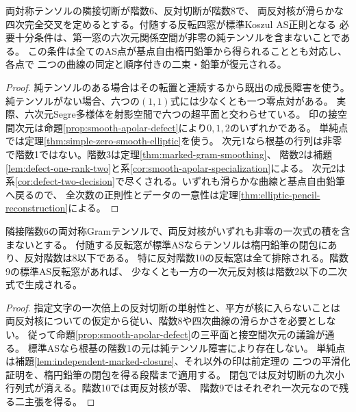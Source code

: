 \begin{theorem}[滑らかな反対四次曲線を持つ反転四窓の分類]\label{thm:smooth-apolar-complete}
両対称テンソルの隣接切断が階数6、反対切断が階数8で、
両反対核が滑らかな四次完全交叉を定めるとする。付随する反転四窓が標準Koszul AS正則となる
必要十分条件は、第一窓の六次元関係空間が非零の純テンソルを含まないことである。
この条件は全てのAS点が基点自由楕円鉛筆から得られることとも対応し、各点で
二つの曲線の同定と順序付きの二束・鉛筆が復元される。
\end{theorem}
\begin{proof}
純テンソルのある場合はその転置と連続するから既出の成長障害を使う。
純テンソルがない場合、六つの$(1,1)$式には少なくとも一つ零点対がある。
実際、六次元Segre多様体を射影空間で六つの超平面と交わらせている。
印の接空間次元は命題\ref{prop:smooth-apolar-defect}により$0,1,2$のいずれかである。
単純点では定理\ref{thm:simple-zero-smooth-elliptic}を使う。
次元1なら根基の行列は非零で階数1ではない。階数3は定理\ref{thm:marked-gram-smoothing}、
階数2は補題\ref{lem:defect-one-rank-two}と系\ref{cor:smooth-apolar-specialization}による。
次元2は系\ref{cor:defect-two-decision}で尽くされる。いずれも滑らかな曲線と基点自由鉛筆へ戻るので、
全次数の正則性とデータの一意性は定理\ref{thm:elliptic-pencil-reconstruction}による。
\end{proof}

\begin{corollary}\label{cor:bisymmetric-high-rank-exclusion}
隣接階数6の両対称Gramテンソルで、両反対核がいずれも非零の一次式の積を含まないとする。
付随する反転窓が標準ASならテンソルは楕円鉛筆の閉包にあり、反対階数は8以下である。
特に反対階数10の反転窓は全て排除される。階数9の標準AS反転窓があれば、
少なくとも一方の一次元反対核は階数2以下の二次式で生成される。
\end{corollary}
\begin{proof}
指定文字の一次倍上の反対切断の単射性と、平方が核に入らないことは
両反対核についての仮定から従い、階数8や四次曲線の滑らかさを必要としない。
従って命題\ref{prop:smooth-apolar-defect}の三平面と接空間次元の議論が通る。
標準ASなら根基の階数1の元は純テンソル障害により存在しない。
単純点は補題\ref{lem:independent-marked-closure}、それ以外の印は前定理の
二つの平滑化証明を、楕円鉛筆の閉包を得る段階まで適用する。
閉包では反対切断の九次小行列式が消える。階数10では両反対核が零、
階数9ではそれぞれ一次元なので残る二主張を得る。
\end{proof}

